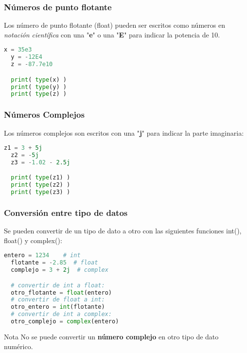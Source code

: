 \begin{frame}[fragile]
  \frametitle{Números de punto flotante}

  Los número de punto flotante (\textcolor{codeKeyword}{float}) pueden ser
  escritos como números en \emph{notación científica} con una "\textbf{e}"
  o una "\textbf{E}" para indicar la potencia de 10.

  \vspace{\baselineskip}
  \begin{lstlisting}[language=Python]
  x = 35e3
  y = -12E4
  z = -87.7e10

  print( type(x) )
  print( type(y) )
  print( type(z) )
  \end{lstlisting}
\end{frame}

\begin{frame}[fragile]
  \frametitle{Números Complejos}

  Los números complejos son escritos con una "\textbf{j}" para indicar
  la parte imaginaria:

  \vspace{\baselineskip}
  \begin{lstlisting}[language=Python]
  z1 = 3 + 5j
  z2 = -5j
  z3 = -1.02 - 2.5j

  print( type(z1) )
  print( type(z2) )
  print( type(z3) )
  \end{lstlisting}
\end{frame}

\begin{frame}[fragile]
  \frametitle{Conversión entre tipo de datos}

  \vspace{\baselineskip}
  Se pueden convertir de un tipo de dato a otro con las siguientes
  funciones \textcolor{codeKeyword}{int}(), \textcolor{codeKeyword}{float}()
  y \textcolor{codeKeyword}{complex}():

  \begin{lstlisting}[language=Python]
  entero = 1234    # int
  flotante = -2.85  # float
  complejo = 3 + 2j  # complex

  # convertir de int a float:
  otro_flotante = float(entero)
  # convertir de float a int:
  otro_entero = int(flotante)
  # convertir de int a complex:
  otro_complejo = complex(entero)\end{lstlisting}

  \begin{alertblock}{Nota}
    No se puede convertir un \textbf{número complejo} en otro tipo de dato numérico.
  \end{alertblock}
\end{frame}

